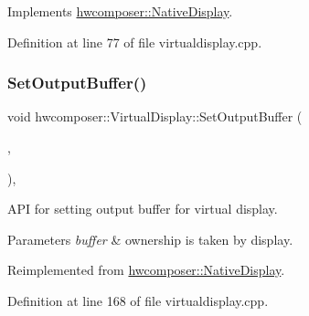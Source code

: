 Implements \mbox{\hyperlink{classhwcomposer_1_1NativeDisplay_a63c51853e0d82baf9d6445cf831a5ad1}{hwcomposer\+::\+Native\+Display}}.



Definition at line 77 of file virtualdisplay.\+cpp.


\begin{DoxyCode}{0}
\end{DoxyCode}
\mbox{\label{classhwcomposer_1_1VirtualDisplay_a392b98e9fbb3ee437212e10b0874512f}} 
\subsubsection{\texorpdfstring{Set\+Output\+Buffer()}{SetOutputBuffer()}}
{\footnotesize\ttfamily void hwcomposer\+::\+Virtual\+Display\+::\+Set\+Output\+Buffer (\begin{DoxyParamCaption}\item[{\mbox{\hyperlink{alios_2platformdefines_8h_ac0a2eaf260f556d17fe489911f017bdf}{H\+W\+C\+Native\+Handle}}}]{,  }\item[{int32\+\_\+t}]{ }\end{DoxyParamCaption})\hspace{0.3cm}{\ttfamily [override]}, {\ttfamily [virtual]}}

A\+PI for setting output buffer for virtual display. 
\begin{DoxyParams}{Parameters}
{\em buffer} & ownership is taken by display. \\
\hline
\end{DoxyParams}


Reimplemented from \mbox{\hyperlink{classhwcomposer_1_1NativeDisplay_ab4214c41977cee260c2703cb01dfd030}{hwcomposer\+::\+Native\+Display}}.



Definition at line 168 of file virtualdisplay.\+cpp.


